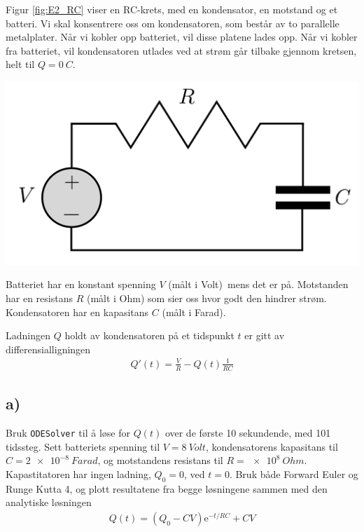 \documentclass[10pt,a4paper]{article}
\renewcommand{\exp}{\mathrm{e}^}
\begin{document}
Figur \ref{fig:E2_RC} viser en RC-krets, med en kondensator, en motstand og et batteri. Vi skal konsentrere oss om kondensatoren, som består av to parallelle metalplater. Når vi kobler opp batteriet, vil disse platene lades opp. Når vi kobler fra batteriet, vil kondensatoren utlades ved at strøm går tilbake gjennom kretsen, helt til $Q = \SI{0}{C}$.
	
\begin{center}
	\includegraphics[scale=1]{fig_RC-cp1.png}
    \label{fig:E2_RC}
\end{center}

	
Batteriet har en konstant spenning $V$ (målt i Volt) mens det er på. Motstanden har en resistans $R$ (målt i Ohm) som sier oss hvor godt den hindrer strøm. Kondensatoren har en kapasitans $C$ (målt i Farad).

Ladningen $Q$ holdt av kondensatoren på et tidspunkt $t$ er gitt av differensialligningen
\begin{align}\label{eqn:Qder}
Q'(t) = \frac{V}{R} - Q(t)\frac{1}{RC}
\end{align}

\subsection*{a)}
Bruk \texttt{ODESolver} til å løse for $Q(t)$ over de første 10 sekundende, med 101 tidssteg. Sett batteriets spenning til $V = \SI{8}{Volt}$, kondensatorens kapasitans til $C = \SI{2e-8}{Farad}$, og motstandens resistans til $R = \SI{e8}{Ohm}$. Kapastitatoren har ingen ladning, $Q_0=0$, ved $t=0$. Bruk både Forward Euler og Runge Kutta 4, og plott resultatene fra begge løsningene sammen med den analytiske løsningen
\begin{align}
Q(t) = (Q_0 - CV)\exp{-t/RC} + CV
\end{align}
\end{document}
